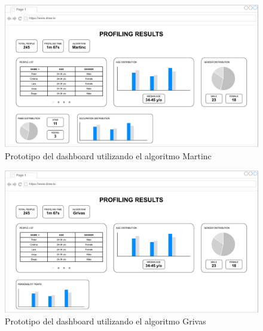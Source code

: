 \bigskip
\begin{figure}[H]
	\centering
	\includegraphics[width=\textwidth]{diagramas/dashboard-martinc.pdf}
	\caption{Prototipo del dashboard utilizando el algoritmo Martinc}
	\label{fig:prototipo_dashboard_martinc}
\end{figure}

\bigskip
\begin{figure}[H]
	\centering
	\includegraphics[width=\textwidth]{diagramas/dashboard-grivas.pdf}
	\caption{Prototipo del dashboard utilizando el algoritmo Grivas}
	\label{fig:prototipo_dashboard_grivas}
\end{figure}
